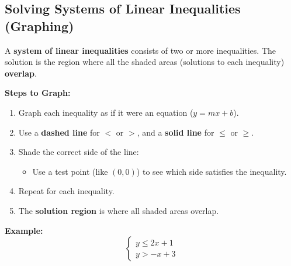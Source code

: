 \documentclass[11pt]{article}
\begin{document}
\subsection{Solving Systems of Linear Inequalities (Graphing)}

A \textbf{system of linear inequalities} consists of two or more inequalities. The solution is the region where all the shaded areas (solutions to each inequality) \textbf{overlap}.

\textbf{Steps to Graph:}
\begin{enumerate}
  \item Graph each inequality as if it were an equation (\( y = mx + b \)).
  \item Use a \textbf{dashed line} for \( < \) or \( > \), and a \textbf{solid line} for \( \leq \) or \( \geq \).
  \item Shade the correct side of the line:
  \begin{itemize}
    \item Use a test point (like \( (0, 0) \)) to see which side satisfies the inequality.
  \end{itemize}
  \item Repeat for each inequality.
  \item The \textbf{solution region} is where all shaded areas overlap.
\end{enumerate}

\textbf{Example:}
\[
\begin{cases}
y \leq 2x + 1 \\
y > -x + 3
\end{cases}
\]

\begin{center}
\end{center}
\end{document}

